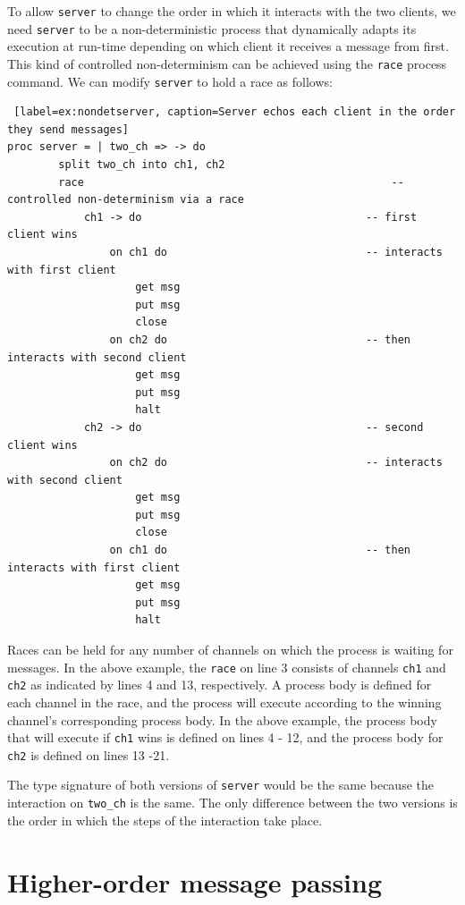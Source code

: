 \documentclass[11pt]{article}
\begin{document}
To allow \lstinline$server$ to change the order in which it interacts with the two clients, we need \lstinline$server$ to be a non-deterministic process that dynamically adapts its execution at run-time depending on which client it receives a message from first.
This kind of controlled non-determinism can be achieved using the \lstinline$race$ process command.
We can modify \lstinline$server$ to hold a race as follows:
\begin{lstlisting} [label=ex:nondetserver, caption=Server echos each client in the order they send messages] 
proc server = | two_ch => -> do
		split two_ch into ch1, ch2		
		race												-- controlled non-determinism via a race
			ch1 -> do									-- first client wins
				on ch1 do								-- interacts with first client
					get msg								
					put msg						
					close
				on ch2 do								-- then interacts with second client
					get msg						
					put msg						
					halt		
			ch2 -> do									-- second client wins
				on ch2 do								-- interacts with second client
					get msg								
					put msg						
					close
				on ch1 do								-- then interacts with first client
					get msg						
					put msg						
					halt			
\end{lstlisting}
Races can be held for any number of channels on which the process is waiting for messages.
In the above example, the \lstinline$race$ on line 3 consists of channels \lstinline$ch1$ and \lstinline$ch2$ as indicated by lines 4 and 13, respectively.
A process body is defined for each channel in the race, and the process will execute according to the winning channel's corresponding process body. 
In the above example, the process body that will execute if \lstinline$ch1$ wins is defined on lines 4 - 12, and the process body for \lstinline$ch2$ is defined on lines 13 -21.

The type signature of both versions of \lstinline$server$ would be the same because the interaction on  \lstinline$two_ch$ is the same.
The only difference between the two versions is the order in which the steps of the interaction take place.


\section{Higher-order message passing}
\end{document}
